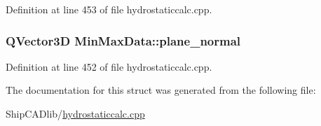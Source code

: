 Definition at line 453 of file hydrostaticcalc.\-cpp.

\hypertarget{structMinMaxData_a62b4b4d97aba034731cdb0f11b23d856}{
\subsubsection[{plane\-\_\-normal}]{\setlength{\rightskip}{0pt plus 5cm}Q\-Vector3\-D Min\-Max\-Data\-::plane\-\_\-normal}}\label{structMinMaxData_a62b4b4d97aba034731cdb0f11b23d856}


Definition at line 452 of file hydrostaticcalc.\-cpp.



The documentation for this struct was generated from the following file\-:\begin{DoxyCompactItemize}
\item 
Ship\-C\-A\-Dlib/\hyperlink{hydrostaticcalc_8cpp}{hydrostaticcalc.\-cpp}\end{DoxyCompactItemize}
